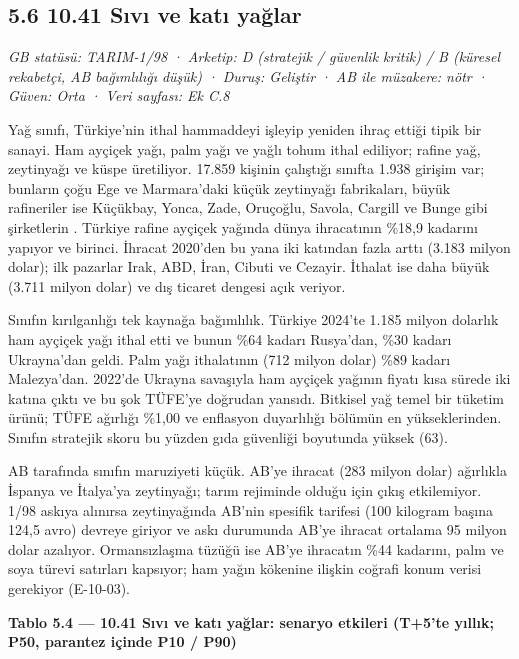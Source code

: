 \hypertarget{nace_kartlar_10-12-56-1041-sux131vux131-ve-katux131-yaux11flar}{%
\subsection{5.6 10.41 Sıvı ve katı yağlar}\label{nace_kartlar_10-12-56-1041-sux131vux131-ve-katux131-yaux11flar}}

\emph{GB statüsü: TARIM-1/98 · Arketip: D (stratejik / güvenlik kritik) / B (küresel rekabetçi, AB bağımlılığı düşük) · Duruş: Geliştir · AB ile müzakere: nötr · Güven: Orta · Veri sayfası: Ek C.8}

Yağ sınıfı, Türkiye'nin ithal hammaddeyi işleyip yeniden ihraç ettiği tipik bir sanayi. Ham ayçiçek yağı, palm yağı ve yağlı tohum ithal ediliyor; rafine yağ, zeytinyağı ve küspe üretiliyor. 17.859 kişinin çalıştığı sınıfta 1.938 girişim var; bunların çoğu Ege ve Marmara'daki küçük zeytinyağı fabrikaları, büyük rafineriler ise Küçükbay, Yonca, Zade, Oruçoğlu, Savola, Cargill ve Bunge gibi şirketlerin \etiketH{}. Türkiye rafine ayçiçek yağında dünya ihracatının \%18,9 kadarını yapıyor ve birinci. İhracat 2020'den bu yana iki katından fazla arttı (3.183 milyon dolar); ilk pazarlar Irak, ABD, İran, Cibuti ve Cezayir. İthalat ise daha büyük (3.711 milyon dolar) ve dış ticaret dengesi açık veriyor.

Sınıfın kırılganlığı tek kaynağa bağımlılık. Türkiye 2024'te 1.185 milyon dolarlık ham ayçiçek yağı ithal etti ve bunun \%64 kadarı Rusya'dan, \%30 kadarı Ukrayna'dan geldi. Palm yağı ithalatının (712 milyon dolar) \%89 kadarı Malezya'dan. 2022'de Ukrayna savaşıyla ham ayçiçek yağının fiyatı kısa sürede iki katına çıktı ve bu şok TÜFE'ye doğrudan yansıdı. Bitkisel yağ temel bir tüketim ürünü; TÜFE ağırlığı \%1,00 ve enflasyon duyarlılığı bölümün en yükseklerinden. Sınıfın stratejik skoru bu yüzden gıda güvenliği boyutunda yüksek (63).

AB tarafında sınıfın maruziyeti küçük. AB'ye ihracat (283 milyon dolar) ağırlıkla İspanya ve İtalya'ya zeytinyağı; tarım rejiminde olduğu için çıkış etkilemiyor. 1/98 askıya alınırsa zeytinyağında AB'nin spesifik tarifesi (100 kilogram başına 124,5 avro) devreye giriyor ve askı durumunda AB'ye ihracat ortalama 95 milyon dolar azalıyor. Ormansızlaşma tüzüğü ise AB'ye ihracatın \%44 kadarını, palm ve soya türevi satırları kapsıyor; ham yağın kökenine ilişkin coğrafi konum verisi gerekiyor (E-10-03).


\textbf{Tablo 5.4 --- 10.41 Sıvı ve katı yağlar: senaryo etkileri (T+5'te yıllık; P50, parantez içinde P10 / P90)}

